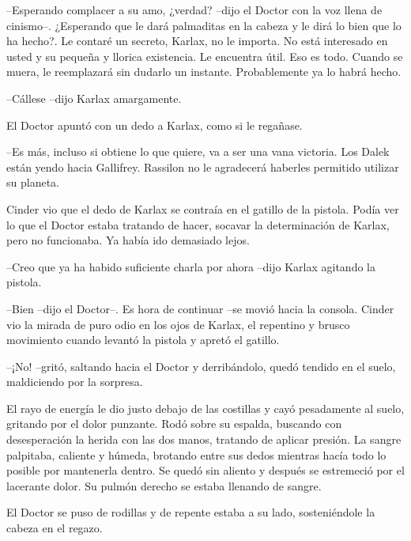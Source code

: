 --Esperando complacer a su amo, ¿verdad? --dijo el Doctor con la voz llena de cinismo--. ¿Esperando que le dará palmaditas en la cabeza y le dirá lo bien que lo ha hecho?. Le contaré un secreto, Karlax, no le importa. No está interesado en usted y su pequeña y llorica existencia. Le encuentra útil. Eso es todo. Cuando se muera, le reemplazará sin dudarlo un instante. Probablemente ya lo habrá hecho.



--Cállese --dijo Karlax amargamente.



El Doctor apuntó con un dedo a Karlax, como si le regañase. 



--Es más, incluso si obtiene lo que quiere, va a ser una vana victoria. Los Dalek están yendo hacia Gallifrey. Rassilon no le agradecerá haberles permitido utilizar su planeta.



Cinder vio que el dedo de Karlax se contraía en el gatillo de la pistola. Podía ver lo que el Doctor estaba tratando de hacer, socavar la determinación de Karlax, pero no funcionaba. Ya había ido demasiado lejos.



--Creo que ya ha habido suficiente charla por ahora --dijo Karlax agitando la pistola.



--Bien --dijo el Doctor--. Es hora de continuar --se movió hacia la consola. Cinder vio la mirada de puro odio en los ojos de Karlax, el repentino y brusco movimiento cuando levantó la pistola y apretó el gatillo.



--¡No! --gritó, saltando hacia el Doctor y derribándolo, quedó tendido en el suelo, maldiciendo por la sorpresa.



El rayo de energía le dio justo debajo de las costillas y cayó pesadamente al suelo, gritando por el dolor punzante. Rodó sobre su espalda, buscando con desesperación la herida con las dos manos, tratando de aplicar presión. La sangre palpitaba, caliente y húmeda, brotando entre sus dedos mientras hacía todo lo posible por mantenerla dentro. Se quedó sin aliento y después se estremeció por el lacerante dolor. Su pulmón derecho se estaba llenando de sangre.



El Doctor se puso de rodillas y de repente estaba a su lado, sosteniéndole la cabeza en el regazo. 



